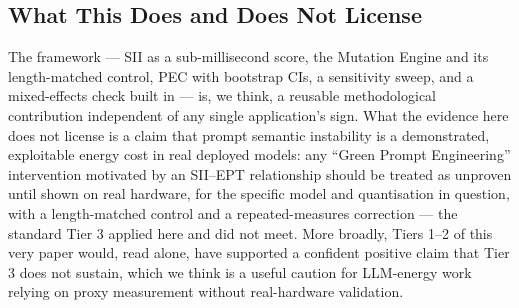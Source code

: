 \documentclass[conference]{IEEEtran}
\begin{document}
\subsection{What This Does and Does Not License}
The framework --- SII as a sub-millisecond score, the Mutation Engine
and its length-matched control, PEC with bootstrap CIs, a sensitivity
sweep, and a mixed-effects check built in --- is, we think, a reusable
methodological contribution independent of any single application's
sign. What the evidence here does not license is a claim that prompt
semantic instability is a demonstrated, exploitable energy cost in
real deployed models: any ``Green Prompt Engineering'' intervention
motivated by an SII--EPT relationship should be treated as unproven
until shown on real hardware, for the specific model and quantisation
in question, with a length-matched control and a repeated-measures
correction --- the standard Tier 3 applied here and did not meet. More
broadly, Tiers 1--2 of this very paper would, read alone, have
supported a confident positive claim that Tier 3 does not sustain,
which we think is a useful caution for LLM-energy work relying on
proxy measurement without real-hardware validation.
\end{document}
